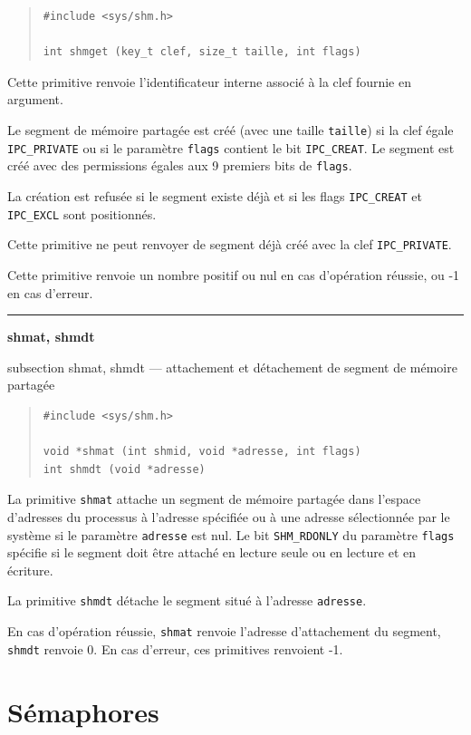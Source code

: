 \documentclass [twoside] {report}
\newcommand {\primitive} [1]
    {
	\phantomsection
	{\large \textbf {#1}}
	\addcontentsline {toc} {subsection} {#1}
    }
\newcommand {\separation}
    {
	\vspace {5mm}
	\nopagebreak
	\hrule
    }
\begin{document}
\begin {quote}
\begin {verbatim}
#include <sys/shm.h>

int shmget (key_t clef, size_t taille, int flags)
\end{verbatim}
\end {quote}

Cette primitive renvoie l'identificateur interne associé à la clef
fournie en argument.

Le segment de mémoire partagée est créé (avec une taille \texttt {taille})
si la clef égale \texttt {IPC\_PRIVATE} ou si le paramètre \texttt {flags}
contient le bit \texttt {IPC\_CREAT}.  Le segment est créé avec des
permissions égales aux 9 premiers bits de \texttt {flags}.

La création est refusée si le segment existe déjà et si les flags
\texttt {IPC\_CREAT} et \texttt {IPC\_EXCL} sont positionnés.

Cette primitive ne peut renvoyer de segment déjà créé avec la clef
\texttt {IPC\_PRIVATE}.

Cette primitive renvoie un nombre positif ou nul en cas d'opération
réussie, ou -1 en cas d'erreur.


\separation
\primitive {shmat, shmdt} --- attachement et détachement de segment de mémoire partagée

\begin {quote}
\begin {verbatim}
#include <sys/shm.h>

void *shmat (int shmid, void *adresse, int flags)
int shmdt (void *adresse)
\end{verbatim}
\end {quote}

La primitive \texttt {shmat} attache un segment de mémoire partagée dans
l'espace d'adresses du processus à l'adresse spécifiée ou à une adresse
sélectionnée par le système si le paramètre \texttt {adresse} est nul. Le
bit \texttt {SHM\_RDONLY} du paramètre \texttt {flags} spécifie si le segment
doit être attaché en lecture seule ou en lecture et en écriture.

La primitive \texttt {shmdt} détache le segment situé à l'adresse
\texttt {adresse}.

En cas d'opération réussie, \texttt {shmat} renvoie l'adresse d'attachement
du segment, \texttt {shmdt} renvoie 0.  En cas d'erreur, ces primitives
renvoient -1.


\section* {Sémaphores}
\end{document}
